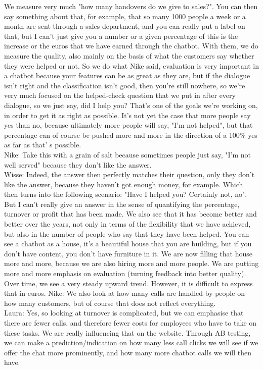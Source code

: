 \begin{appendices}
	\break
	We measure very much "how many handovers do we give to sales?". You can then say something about that, for example, that so many 1000 people a week or a month are sent through a sales department, and you can really put a label on that, but I can't just give you a number or a given percentage of this is the increase or the euros that we have earned through the chatbot. With them, we do measure the quality, also mainly on the basis of what the customers say whether they were helped or not. So we do what Nike said, evaluation is very important in a chatbot because your features can be as great as they are, but if the dialogue isn't right and the classification isn't good, then you're still nowhere, so we're very much focused on the helped-check question that we put in after every dialogue, so we just say, did I help you? That's one of the goals we're working on, in order to get it as right as possible. It's not yet the case that more people say yes than no, because ultimately more people will say, "I'm not helped", but that percentage can of course be pushed more and more in the direction of a 100\% yes as far as that' s possible.\\
	\break
	Nike: Take this with a grain of salt because sometimes people just say, "I'm not well served" because they don't like the answer.\\
	\break
	Wisse: Indeed, the answer then perfectly matches their question, only they don't like the answer, because they haven't got enough money, for example. Which then turns into the following scenario: "Have I helped you? Certainly not, no". But I can't really give an answer in the sense of quantifying the percentage, turnover or profit that has been made. We also see that it has become better and better over the years, not only in terms of the flexibility that we have achieved, but also in the number of people who say that they have been helped. You can see a chatbot as a house, it's a beautiful house that you are building, but if you don't have content, you don't have furniture in it. We are now filling that house more and more, because we are also hiring more and more people. We are putting more and more emphasis on evaluation (turning feedback into better quality). Over time, we see a very steady upward trend. However, it is difficult to express that in euros. 
	Nike: We also look at how many calls are handled by people on how many customers, but of course that does not reflect everything.\\
	\break
	Laura: Yes, so looking at turnover is complicated, but we can emphasise that there are fewer calls, and therefore fewer costs for employees who have to take on these tasks. We are really influencing that on the website. Through AB testing, we can make a prediction/indication on how many less call clicks we will see if we offer the chat more prominently, and how many more chatbot calls we will then have.\\

\end{appendices}
